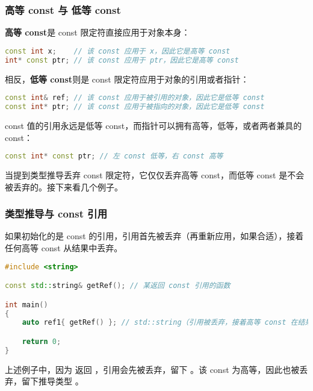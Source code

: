 \documentclass[../../LearnCpp.tex]{subfiles}
\begin{document}
\subsubsection*{高等 const 与 低等 const}

\textbf{高等 const}是 const 限定符直接应用于对象本身：

\begin{lstlisting}[language=C++]
const int x;    // 该 const 应用于 x，因此它是高等 const
int* const ptr; // 该 const 应用于 ptr，因此它是高等 const
\end{lstlisting}

相反，\textbf{低等 const}则是 const 限定符应用于对象的引用或者指针：

\begin{lstlisting}[language=C++]
const int& ref; // 该 const 应用于被引用的对象，因此它是低等 const
const int* ptr; // 该 const 应用于被指向的对象，因此它是低等 const
\end{lstlisting}

const 值的引用永远是低等 const，而指针可以拥有高等，低等，或者两者兼具的 const：

\begin{lstlisting}[language=C++]
const int* const ptr; // 左 const 低等，右 const 高等
\end{lstlisting}

当提到类型推导丢弃 const 限定符，它仅仅丢弃高等 const，而低等 const 是不会被丢弃的。接下来看几个例子。

\subsubsection*{类型推导与 const 引用}

如果初始化的是 const 的引用，引用首先被丢弃（再重新应用，如果合适），接着任何高等 const 从结果中丢弃。

\begin{lstlisting}[language=C++]
#include <string>

const std::string& getRef(); // 某返回 const 引用的函数

int main()
{
    auto ref1{ getRef() }; // std::string（引用被丢弃，接着高等 const 在结果中被丢弃）

    return 0;
}
\end{lstlisting}

上述例子中，因为  返回 ，引用会先被丢弃，留下 。该 const 为高等，因此也被丢弃，留下推导类型 。
\end{document}
